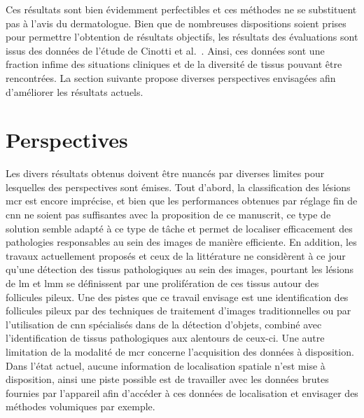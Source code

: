 Ces résultats sont bien évidemment perfectibles et ces méthodes ne se substituent pas à l'avis du dermatologue. Bien que de nombreuses dispositions soient prises pour permettre l'obtention de résultats objectifs, les résultats des évaluations sont issus des données de l'étude de Cinotti et al.~\cite{Cinotti2016}. Ainsi, ces données sont une fraction infime des situations cliniques et de la diversité de tissus pouvant être rencontrées. La section suivante propose diverses perspectives envisagées afin d'améliorer les résultats actuels.\par
\clearpage

\section*{Perspectives}
Les divers résultats obtenus doivent être nuancés par diverses limites pour lesquelles des perspectives sont émises. Tout d'abord, la classification des lésions \gls{mcr} est encore imprécise, et bien que les performances obtenues par réglage fin de \gls{cnn} ne soient pas suffisantes avec la proposition de ce manuscrit, ce type de solution semble adapté à ce type de tâche et permet de localiser efficacement des pathologies responsables au sein des images de manière efficiente. En addition, les travaux actuellement proposés et ceux de la littérature ne considèrent à ce jour qu'une détection des tissus pathologiques au sein des images, pourtant les lésions de \gls{lm} et \gls{lmm} se définissent par une prolifération de ces tissus autour des follicules pileux. Une des pistes que ce travail envisage est une identification des follicules pileux par des techniques de traitement d'images traditionnelles ou par l'utilisation de \gls{cnn} spécialisés dans de la détection d'objets, combiné avec l'identification de tissus pathologiques aux alentours de ceux-ci. Une autre limitation de la modalité de \gls{mcr} concerne l'acquisition des données à disposition. Dans l'état actuel, aucune information de localisation spatiale n'est mise à disposition, ainsi une piste possible est de travailler avec les données brutes fournies par l'appareil afin d'accéder à ces données de localisation et envisager des méthodes volumiques par exemple.\par

